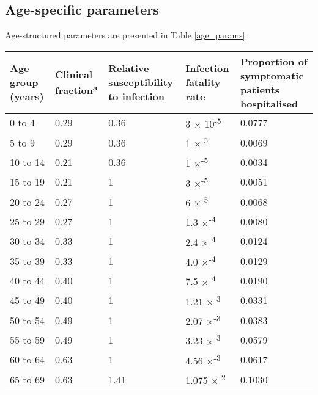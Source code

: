 \subsection{Age-specific parameters}

Age-structured parameters are presented in Table \ref{age_params}.

\begin{table}[ht]
\renewcommand{\baselinestretch}{1}
    \begin{tabular}[ht]{| p{2cm} | p{2.5cm} | p{3cm} | p{3cm} | p{2.5cm}|}
    \hline
        Age group (years) & Clinical fraction\textsuperscript{a} & Relative susceptibility to infection & Infection fatality rate & Proportion of symptomatic patients hospitalised \\
        \hline
        0 to 4 & 0.29 & 0.36 & 3 $\times$ 10\textsuperscript{-5} & 0.0777 \\
        \hline
        5 to 9 & 0.29 & 0.36 & 1 $\times$\textsuperscript{-5} & 0.0069 \\
        \hline
        10 to 14 & 0.21 & 0.36 & 1 $\times$\textsuperscript{-5} & 0.0034 \\
        \hline
        15 to 19 & 0.21 & 1 & 3 $\times$\textsuperscript{-5} & 0.0051 \\
        \hline
        20 to 24 & 0.27 & 1 & 6 $\times$\textsuperscript{-5} & 0.0068 \\
        \hline
        25 to 29 & 0.27 & 1 & 1.3 $\times$\textsuperscript{-4} & 0.0080 \\
        \hline
        30 to 34 & 0.33 & 1 & 2.4 $\times$\textsuperscript{-4} & 0.0124 \\
        \hline
        35 to 39 & 0.33 & 1 & 4.0 $\times$\textsuperscript{-4} & 0.0129 \\
        \hline
        40 to 44 & 0.40 & 1 & 7.5 $\times$\textsuperscript{-4} & 0.0190 \\
        \hline
        45 to 49 & 0.40 & 1 & 1.21 $\times$\textsuperscript{-3} & 0.0331 \\
        \hline
        50 to 54 & 0.49 & 1 & 2.07 $\times$\textsuperscript{-3} & 0.0383 \\
        \hline
        55 to 59 & 0.49 & 1 & 3.23 $\times$\textsuperscript{-3} & 0.0579 \\
        \hline
        60 to 64 & 0.63 & 1 & 4.56 $\times$\textsuperscript{-3} & 0.0617 \\
        \hline
        65 to 69 & 0.63 & 1.41 & 1.075 $\times$\textsuperscript{-2} & 0.1030 \\

\end{tabular}
\end{table}
